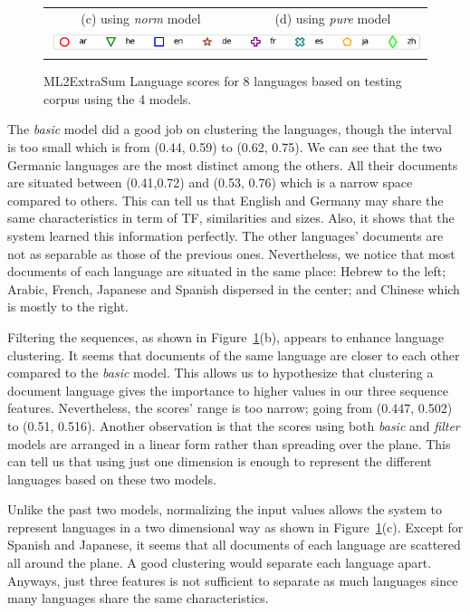{\begin{landscape}
\begin{figure}[!ht]
\begin{tabular}{cc}
		(c) using \textit{norm} model & (d) using \textit{pure} model  \\
		\multicolumn{2}{c}{\includegraphics{figures/ml2extrasum/lang-legend.png}}
	\end{tabular}
	
	\caption{ML2ExtraSum Language scores for 8 languages based on testing corpus using the 4 models.}
	\label{fig:lang-scores}
\end{figure}
\end{landscape}
}

The \textit{basic} model did a good job on clustering the languages, though the interval is too small which is from (0.44, 0.59) to (0.62, 0.75). 
We can see that the two Germanic languages are the most distinct among the others. 
All their documents are situated between (0.41,0.72) and (0.53, 0.76) which is a narrow space compared to others. 
This can tell us that English and Germany may share the same characteristics in term of TF, similarities and sizes. 
Also, it shows that the system learned this information perfectly.
The other languages' documents are not as separable as those of the previous ones. 
Nevertheless, we notice that most documents of each language are situated in the same place: Hebrew to the left; Arabic, French, Japanese and Spanish dispersed in the center; and Chinese which is mostly to the right. 

Filtering the sequences, as shown in Figure~\ref{fig:lang-scores}(b), appears to enhance language clustering. 
It seems that documents of the same language are closer to each other compared to the \textit{basic} model.
This allows us to hypothesize that clustering a document language gives the importance to higher values in our three sequence features.
Nevertheless, the scores' range is too narrow; going from (0.447, 0.502) to (0.51, 0.516). 
Another observation is that the scores using both \textit{basic} and \textit{filter} models are arranged in a linear form rather than spreading over the plane.
This can tell us that using just one dimension is enough to represent the different languages based on these two models. 


Unlike the past two models, normalizing the input values allows the system to represent languages in a two dimensional way as shown in Figure~\ref{fig:lang-scores}(c). 
Except for Spanish and Japanese, it seems that all documents of each language are scattered all around the plane. 
A good clustering would separate each language apart.  
Anyways, just three features is not sufficient to separate as much languages since many languages share the same characteristics. 


